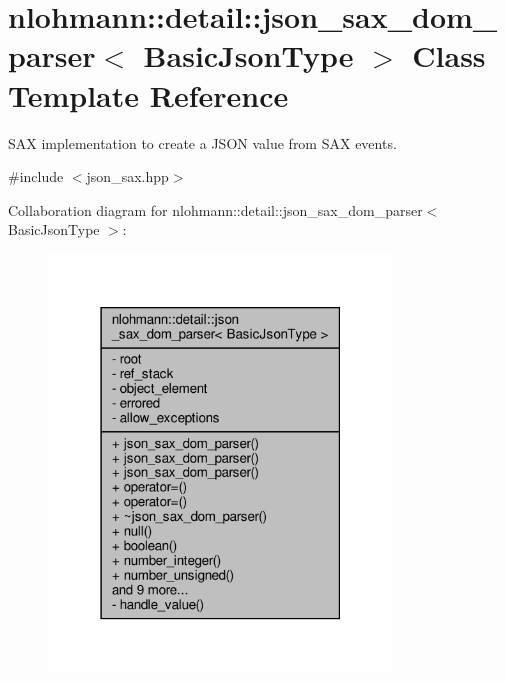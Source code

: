 \hypertarget{classnlohmann_1_1detail_1_1json__sax__dom__parser}{}\section{nlohmann\+:\+:detail\+:\+:json\+\_\+sax\+\_\+dom\+\_\+parser$<$ Basic\+Json\+Type $>$ Class Template Reference}
\label{classnlohmann_1_1detail_1_1json__sax__dom__parser}


S\+AX implementation to create a J\+S\+ON value from S\+AX events.  




{\ttfamily \#include $<$json\+\_\+sax.\+hpp$>$}



Collaboration diagram for nlohmann\+:\+:detail\+:\+:json\+\_\+sax\+\_\+dom\+\_\+parser$<$ Basic\+Json\+Type $>$\+:\nopagebreak
\begin{figure}[H]
\begin{center}
\leavevmode
\includegraphics[width=259pt]{classnlohmann_1_1detail_1_1json__sax__dom__parser__coll__graph}
\end{center}
\end{figure}
